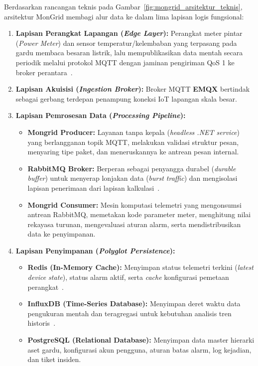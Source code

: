 Berdasarkan rancangan teknis pada Gambar~\ref{fig:mongrid_arsitektur_teknis}, arsitektur MonGrid membagi alur data ke dalam lima lapisan logis fungsional:
\begin{enumerate}[label=\arabic*., leftmargin=*, itemsep=0pt]
  \item \textbf{Lapisan Perangkat Lapangan (\textit{Edge Layer}):} Perangkat meter pintar (\textit{Power Meter}) dan sensor temperatur/kelembaban yang terpasang pada gardu membaca besaran listrik, lalu mempublikasikan data mentah secara periodik melalui protokol MQTT dengan jaminan pengiriman QoS 1 ke broker perantara~\cite{naik2017choice}.
  \item \textbf{Lapisan Akuisisi (\textit{Ingestion Broker}):} Broker MQTT \textbf{EMQX} bertindak sebagai gerbang terdepan penampung koneksi IoT lapangan skala besar.
  \item \textbf{Lapisan Pemrosesan Data (\textit{Processing Pipeline}):}
  \begin{itemize}[leftmargin=*, itemsep=0pt]
    \item \textbf{Mongrid Producer:} Layanan tanpa kepala (\textit{headless .NET service}) yang berlangganan topik MQTT, melakukan validasi struktur pesan, menyaring tipe paket, dan meneruskannya ke antrean pesan internal.
    \item \textbf{RabbitMQ Broker:} Berperan sebagai penyangga durabel (\textit{durable buffer}) untuk menyerap lonjakan data (\textit{burst traffic}) dan mengisolasi lapisan penerimaan dari lapisan kalkulasi~\cite{rabbitmq_doc}.
    \item \textbf{Mongrid Consumer:} Mesin komputasi telemetri yang mengonsumsi antrean RabbitMQ, memetakan kode parameter meter, menghitung nilai rekayasa turunan, mengevaluasi aturan alarm, serta mendistribusikan data ke penyimpanan.
  \end{itemize}
  \item \textbf{Lapisan Penyimpanan (\textit{Polyglot Persistence}):}
  \begin{itemize}[leftmargin=*, itemsep=0pt]
    \item \textbf{Redis (In-Memory Cache):} Menyimpan status telemetri terkini (\textit{latest device state}), status alarm aktif, serta \textit{cache} konfigurasi pemetaan perangkat~\cite{kabakus2017performance}.
    \item \textbf{InfluxDB (Time-Series Database):} Menyimpan deret waktu data pengukuran mentah dan teragregasi untuk kebutuhan analisis tren historis~\cite{influxdb_downsample}.
    \item \textbf{PostgreSQL (Relational Database):} Menyimpan data master hierarki aset gardu, konfigurasi akun pengguna, aturan batas alarm, log kejadian, dan tiket insiden.

\end{itemize}
\end{enumerate}
